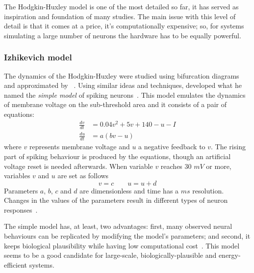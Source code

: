 The Hodgkin-Huxley model is one of the most detailed so far, it has served as inspiration and foundation of many studies. The main issue with this level of detail is that it comes at a price, it's computationally expensive; so, for systems simulating a large number of neurons the hardware has to be equally powerful.

\subsubsection{Izhikevich model}
The dynamics of the Hodgkin-Huxley were studied using bifurcation diagrams and approximated by \citeauthor{fitzhugh1961impulses}~\cite{fitzhugh1961impulses}. Using similar ideas and techniques, \citeauthor{izhikevich2003simple} developed what he named the \emph{simple model} of spiking neurons~\cite{izhikevich2003simple}. This model emulates the dynamics of membrane voltage on the sub-threshold area and it consists of a pair of equations:
\begin{align}
  \frac{dv}{dt} &= 0.04v^{2} + 5v + 140 - u - I \\[0.5em]
  \frac{du}{dt} &= a(bv - u)
\end{align}
where $v$ represents membrane voltage and $u$ a negative feedback to $v$. The rising part of spiking behaviour is produced by the equations, though an artificial voltage reset is needed afterwards. When variable $v$ reaches 30 $mV$ or more, variables $v$ and $u$ are set as follows
\begin{equation}
  v = c \qquad u = u + d
\end{equation}
Parameters $a$, $b$, $c$ and $d$ are dimensionless and time has a $ms$ resolution. Changes in  the values of the parameters result in different types of neuron responses~\cite{dynamical-systems-Izhikevich2007}. 

The simple model has, at least, two advantages: first, many observed neural behaviours can be replicated by modifying the model's parameters; and second, it keeps biological plausibility while having low computational cost~\cite{izhikevich2004model}. This model seems to be a good candidate for large-scale, biologically-plausible and energy-efficient systems.












